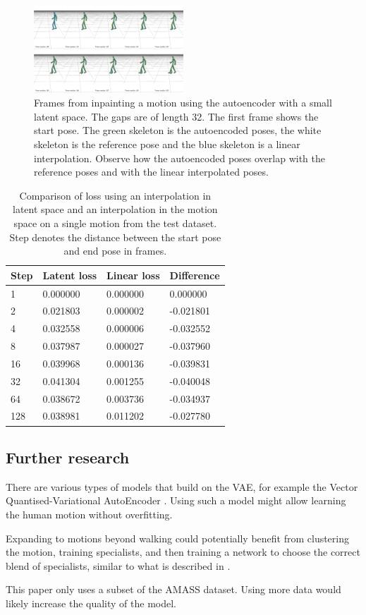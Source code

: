 \begin{figure}[h]
\centering
\includegraphics[width=0.5\textwidth]{img/vae-inpainting}
\caption{Frames from inpainting a motion using the autoencoder with a small latent space. The gaps are of length 32. The first frame shows the start pose. The green skeleton is the autoencoded poses, the white skeleton is the reference pose and the blue skeleton is a linear interpolation. Observe how the autoencoded poses overlap with the reference poses and with the linear interpolated poses.}
\label{fig:vae-inpainting}
\end{figure}

\begin{table}[h]
\centering
\begin{tabular}{@{}llll@{}}
\toprule
Step & Latent loss & Linear loss & Difference  \\ \midrule
1    & 0.000000    & 0.000000    & 0.000000    \\
2    & 0.021803    & 0.000002    & -0.021801   \\
4    & 0.032558    & 0.000006    & -0.032552   \\
8    & 0.037987    & 0.000027    & -0.037960   \\
16   & 0.039968    & 0.000136    & -0.039831   \\
32   & 0.041304    & 0.001255    & -0.040048   \\
64   & 0.038672    & 0.003736    & -0.034937   \\
128  & 0.038981    & 0.011202    & -0.027780   \\ \bottomrule
\end{tabular}
\caption{Comparison of loss using an interpolation in latent space and an interpolation in the motion space on a single motion from the test dataset. Step denotes the distance between the start pose and end pose in frames.}
\label{tab:vae-eval}
\end{table}

\newpage

\subsection{Further research}\label{subsec:further-research}
There are various types of models that build on the VAE, for example the Vector Quantised-Variational AutoEncoder \cite{VQVAE}. Using such a model might allow learning the human motion without overfitting.

Expanding to motions beyond walking could potentially benefit from clustering the motion, training specialists, and then training a network to choose the correct blend of specialists, similar to what is described in \cite{won2020scalable}.

This paper only uses a subset of the AMASS dataset. Using more data would likely increase the quality of the model.
